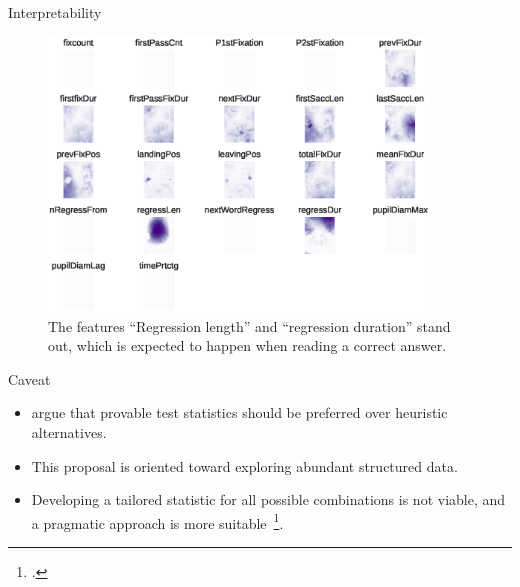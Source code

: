 \documentclass[10pt]{beamer}
\begin{document}
\begin{frame}{Interpretability}
    \begin{figure}
        \centering
        \includegraphics[trim=5pt 75pt 5pt 5pt,clip,width=0.9\textwidth]{eye_features.eps}
        \caption{
            The features ``Regression length'' and ``regression duration'' stand out,
            which is expected to happen when reading a correct answer.
        }
    \end{figure}
\end{frame}


\begin{frame}{Caveat}
    \begin{itemize}
        \item \cite{rosenblatt2019better} argue that provable test statistics
            should be preferred over heuristic alternatives.
        \item This proposal is oriented toward exploring abundant structured data.
        \item Developing a tailored statistic for all possible combinations is not viable,
            and a pragmatic approach is more suitable~\footcite{kim2021classification}.
    \end{itemize}
\end{frame}
\end{document}
